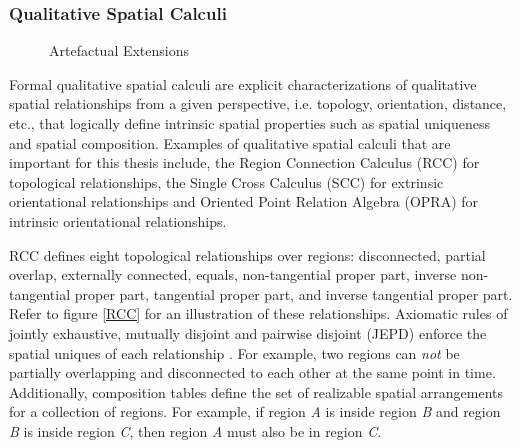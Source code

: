 \documentclass[12pt]{ucthesis}
\begin{document}
\subsubsection{Qualitative Spatial Calculi}
\begin{figure}[t]
 \centering
 \hspace{7 mm}
  \hspace{7 mm}
 \caption{Artefactual Extensions}
\label{Qualitative Spatial Calculi}
\end{figure}

Formal qualitative spatial calculi are explicit characterizations of qualitative spatial relationships from a given perspective, i.e. topology, orientation, distance, etc., that logically define intrinsic spatial properties such as spatial uniqueness and spatial composition. Examples of qualitative spatial calculi that are important for this thesis include, the Region Connection Calculus (RCC) \cite{Randell92aspatial} for topological relationships, the Single Cross Calculus (SCC) for extrinsic orientational relationships \cite{Freksa92usingorientation} and Oriented Point Relation Algebra (OPRA) \cite{Moratz} for intrinsic orientational relationships.

RCC defines eight topological relationships over regions: disconnected, partial overlap, externally connected, equals, non-tangential proper part, inverse non-tangential proper part, tangential proper part, and inverse tangential proper part. Refer to figure \ref{RCC} for an illustration of these relationships. Axiomatic rules of jointly exhaustive, mutually disjoint and pairwise disjoint (JEPD) enforce the spatial uniques of each relationship \cite{Randell92aspatial}. For example, two regions can \emph{not} be partially overlapping and disconnected to each other at the same point in time. Additionally, composition tables define the set of realizable spatial arrangements for a collection of regions. For example, if region \emph{A} is inside region \emph{B} and region \emph{B} is inside region \emph{C}, then region \emph{A} must also be in region \emph{C}.
\end{document}
